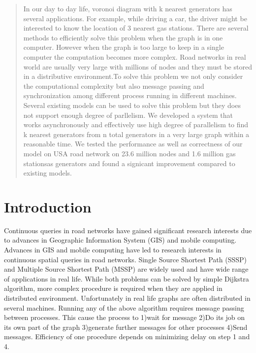 \documentclass{sig-alternate}
\begin{document}

\maketitle
\begin{abstract}
In our day to day life, voronoi diagram with k nearest generators has several applications. For example, while driving a car, the driver might be interested to know the location of 3 nearest gas stations. There are several methods to efficiently solve this problem when the graph is in one computer. However when the graph is too large to keep in a single computer the computation becomes more complex. Road networks in real world are usually very large with millions of nodes and they must be stored in a distributive environment.To solve this problem we not only consider the computational complexity but also message passing and synchronization among different process running in different machines. Several existing models can be used to solve this problem but they does not support enough degree of parllelism. We developed a system that works asynchronously and effectively use high degree of parallelism to find k nearest generators from n total generators in a very large graph within a reasonable time. We tested the performance as well as correctness of our model on USA road network on 23.6 million nodes and 1.6 million gas stationsas generators and found a signicant improvement compared to existing models.  
\end{abstract}

\keywords{} %

\section{Introduction}
Continuous queries in road networks have gained significant research
interests due to advances in Geographic Information System (GIS) and mobile computing. Advances in GIS and mobile computing have led to research interests
in continuous spatial queries in road networks. Single Source Shortest Path (SSSP) and Multiple Source Shortest Path (MSSP) are widely used and have wide range of applications in real life. While both problems can be solved by simple Dijkstra algorithm, more complex procedure is required when they are applied in distributed environment. Unfortunately in real life graphs are often distributed in several machines. Running any of the above algorithm requires message passing between processes. This cause the process to 
1)wait for message 2)Do its job on its own part of the graph 3)generate further messages for other processes 4)Send messages. Efficiency of one procedure depends on minimizing delay on step 1 and 4. 
\end{document}
